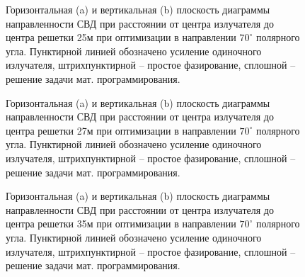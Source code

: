 \begin{figure}
\begin{minipage}[h]{0.49\linewidth}
\end{minipage}
\hfill
\begin{minipage}[h]{0.49\linewidth}
\end{minipage}
\caption{Горизонтальная (a) и вертикальная (b) плоскость диаграммы направленности СВД при расстоянии от центра излучателя до центра решетки 25м при оптимизации в направлении $70^{\circ}$ полярного угла. Пунктирной линией обозначено усиление одиночного излучателя, штрихпунктирной -- простое фазирование, сплошной -- решение задачи мат. программирования.}
\label{ris:svd_mut_5_70_25}
\end{figure}

\begin{figure}
\begin{minipage}[h]{0.49\linewidth}
\end{minipage}
\hfill
\begin{minipage}[h]{0.49\linewidth}
\end{minipage}
\caption{Горизонтальная (a) и вертикальная (b) плоскость диаграммы направленности СВД при расстоянии от центра излучателя до центра решетки 27м при оптимизации в направлении $70^{\circ}$ полярного угла. Пунктирной линией обозначено усиление одиночного излучателя, штрихпунктирной -- простое фазирование, сплошной -- решение задачи мат. программирования.}
\label{ris:svd_mut_5_70_27}
\end{figure}

\begin{figure}
\begin{minipage}[h]{0.49\linewidth}
\end{minipage}
\hfill
\begin{minipage}[h]{0.49\linewidth}
\end{minipage}
\caption{Горизонтальная (a) и вертикальная (b) плоскость диаграммы направленности СВД при расстоянии от центра излучателя до центра решетки 35м при оптимизации в направлении $70^{\circ}$ полярного угла. Пунктирной линией обозначено усиление одиночного излучателя, штрихпунктирной -- простое фазирование, сплошной -- решение задачи мат. программирования.}
\label{ris:svd_mut_5_70_35}
\end{figure}


